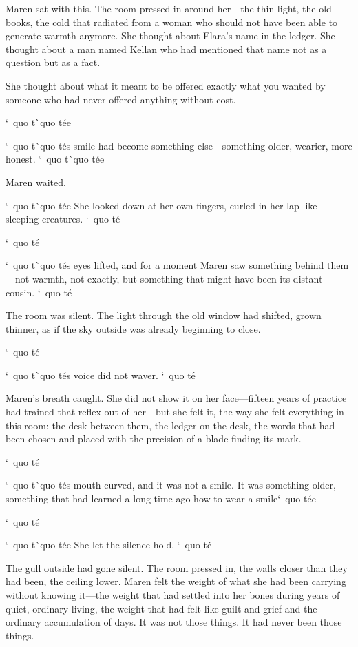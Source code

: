 \documentclass[12pt,letterpaper,openany]{book}
\begin{document}
\par
Maren sat with this. The room pressed in around her—the thin light, the old books, the cold that radiated from a woman who should not have been able to generate warmth anymore. She thought about Elara's name in the ledger. She thought about a man named Kellan who had mentioned that name not as a question but as a fact.
\par
She thought about what it meant to be offered exactly what you wanted by someone who had never offered anything without cost.
\par
`\ quo t\`\ quo t\'e{}e{}
\par
`\ quo t\`\ quo t\'e{}s smile had become something else—something older, wearier, more honest. `\ quo t\`\ quo t\'e{}e{}
\par
Maren waited.
\par
`\ quo t\`\ quo t\'e{}e{} She looked down at her own fingers, curled in her lap like sleeping creatures. `\ quo t\'e{}
\par
`\ quo t\'e{}
\par
`\ quo t\`\ quo t\'e{}s eyes lifted, and for a moment Maren saw something behind them—not warmth, not exactly, but something that might have been its distant cousin. `\ quo t\'e{}
\par
The room was silent. The light through the old window had shifted, grown thinner, as if the sky outside was already beginning to close.
\par
`\ quo t\'e{}
\par
`\ quo t\`\ quo t\'e{}s voice did not waver. `\ quo t\'e{}
\par
Maren's breath caught. She did not show it on her face—fifteen years of practice had trained that reflex out of her—but she felt it, the way she felt everything in this room: the desk between them, the ledger on the desk, the words that had been chosen and placed with the precision of a blade finding its mark.
\par
`\ quo t\'e{}
\par
`\ quo t\`\ quo t\'e{}s mouth curved, and it was not a smile. It was something older, something that had learned a long time ago how to wear a smile`\ quo t\'e{}e{}
\par
`\ quo t\'e{}
\par
`\ quo t\`\ quo t\'e{}e{} She let the silence hold. `\ quo t\'e{}
\par
The gull outside had gone silent. The room pressed in, the walls closer than they had been, the ceiling lower. Maren felt the weight of what she had been carrying without knowing it—the weight that had settled into her bones during years of quiet, ordinary living, the weight that had felt like guilt and grief and the ordinary accumulation of days. It was not those things. It had never been those things.
\end{document}
